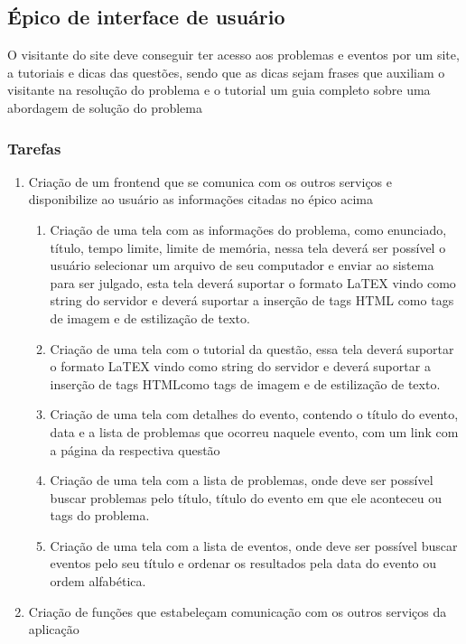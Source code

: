 \subsection{Épico de interface de usuário}

O visitante do site deve conseguir ter acesso aos problemas e eventos por um site, a tutoriais e dicas das questões, sendo que as dicas sejam frases que auxiliam o visitante na resolução do problema e o tutorial um guia completo sobre uma abordagem de solução do problema

\subsubsection{Tarefas}
\begin{enumerate}

    \item Criação de um frontend que se comunica com os outros serviços e disponibilize ao usuário as informações citadas no épico acima
          \begin{enumerate}
              \item Criação de uma tela com as informações do problema, como enunciado, título, tempo limite, limite de memória, nessa tela deverá ser possível o usuário selecionar um arquivo de seu computador e enviar ao sistema para ser julgado, esta tela deverá suportar o formato LaTEX vindo como string do servidor e deverá suportar a inserção de tags HTML como tags de imagem e de estilização de texto.
              \item Criação de uma tela com o tutorial da questão, essa tela deverá suportar o formato LaTEX vindo como string do servidor e deverá suportar a inserção de tags HTMLcomo tags de imagem e de estilização de texto.
              \item Criação de uma tela com detalhes do evento, contendo o título do evento, data e a lista de problemas que ocorreu naquele evento, com um link com a página da respectiva questão
              \item Criação de uma tela com a lista de problemas, onde deve ser possível buscar problemas pelo título, título do evento em que ele aconteceu ou tags do problema.
              \item Criação de uma tela com a lista de eventos, onde deve ser possível buscar eventos pelo seu título e ordenar os resultados pela data do evento ou ordem alfabética.
          \end{enumerate}
    \item Criação de funções que estabeleçam comunicação com os outros serviços da aplicação

\end{enumerate}
